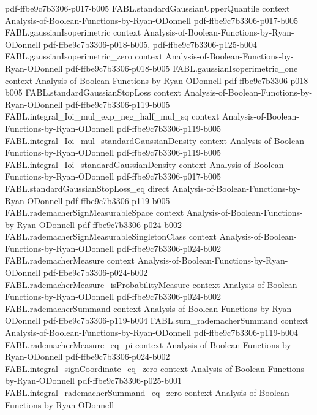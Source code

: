 \begin{theorem}
  {pdf-ffbe9c7b3306-p017-b005}
\proofstep
  {FABL.standardGaussianUpperQuantile}
  {context}
  {Analysis-of-Boolean-Functions-by-Ryan-ODonnell}
  {pdf-ffbe9c7b3306-p017-b005}
\proofstep
  {FABL.gaussianIsoperimetric}
  {context}
  {Analysis-of-Boolean-Functions-by-Ryan-ODonnell}
  {pdf-ffbe9c7b3306-p018-b005,
    pdf-ffbe9c7b3306-p125-b004}
\proofstep
  {FABL.gaussianIsoperimetric_zero}
  {context}
  {Analysis-of-Boolean-Functions-by-Ryan-ODonnell}
  {pdf-ffbe9c7b3306-p018-b005}
\proofstep
  {FABL.gaussianIsoperimetric_one}
  {context}
  {Analysis-of-Boolean-Functions-by-Ryan-ODonnell}
  {pdf-ffbe9c7b3306-p018-b005}
\proofstep
  {FABL.standardGaussianStopLoss}
  {context}
  {Analysis-of-Boolean-Functions-by-Ryan-ODonnell}
  {pdf-ffbe9c7b3306-p119-b005}
\proofstep
  {FABL.integral_Ioi_mul_exp_neg_half_mul_sq}
  {context}
  {Analysis-of-Boolean-Functions-by-Ryan-ODonnell}
  {pdf-ffbe9c7b3306-p119-b005}
\proofstep
  {FABL.integral_Ioi_mul_standardGaussianDensity}
  {context}
  {Analysis-of-Boolean-Functions-by-Ryan-ODonnell}
  {pdf-ffbe9c7b3306-p119-b005}
\proofstep
  {FABL.integral_Ioi_standardGaussianDensity}
  {context}
  {Analysis-of-Boolean-Functions-by-Ryan-ODonnell}
  {pdf-ffbe9c7b3306-p017-b005}
\proofstep
  {FABL.standardGaussianStopLoss_eq}
  {direct}
  {Analysis-of-Boolean-Functions-by-Ryan-ODonnell}
  {pdf-ffbe9c7b3306-p119-b005}
\proofstep
  {FABL.rademacherSignMeasurableSpace}
  {context}
  {Analysis-of-Boolean-Functions-by-Ryan-ODonnell}
  {pdf-ffbe9c7b3306-p024-b002}
\proofstep
  {FABL.rademacherSignMeasurableSingletonClass}
  {context}
  {Analysis-of-Boolean-Functions-by-Ryan-ODonnell}
  {pdf-ffbe9c7b3306-p024-b002}
\proofstep
  {FABL.rademacherMeasure}
  {context}
  {Analysis-of-Boolean-Functions-by-Ryan-ODonnell}
  {pdf-ffbe9c7b3306-p024-b002}
\proofstep
  {FABL.rademacherMeasure_isProbabilityMeasure}
  {context}
  {Analysis-of-Boolean-Functions-by-Ryan-ODonnell}
  {pdf-ffbe9c7b3306-p024-b002}
\proofstep
  {FABL.rademacherSummand}
  {context}
  {Analysis-of-Boolean-Functions-by-Ryan-ODonnell}
  {pdf-ffbe9c7b3306-p119-b004}
\proofstep
  {FABL.sum_rademacherSummand}
  {context}
  {Analysis-of-Boolean-Functions-by-Ryan-ODonnell}
  {pdf-ffbe9c7b3306-p119-b004}
\proofstep
  {FABL.rademacherMeasure_eq_pi}
  {context}
  {Analysis-of-Boolean-Functions-by-Ryan-ODonnell}
  {pdf-ffbe9c7b3306-p024-b002}
\proofstep
  {FABL.integral_signCoordinate_eq_zero}
  {context}
  {Analysis-of-Boolean-Functions-by-Ryan-ODonnell}
  {pdf-ffbe9c7b3306-p025-b001}
\proofstep
  {FABL.integral_rademacherSummand_eq_zero}
  {context}
  {Analysis-of-Boolean-Functions-by-Ryan-ODonnell}

\end{theorem}
